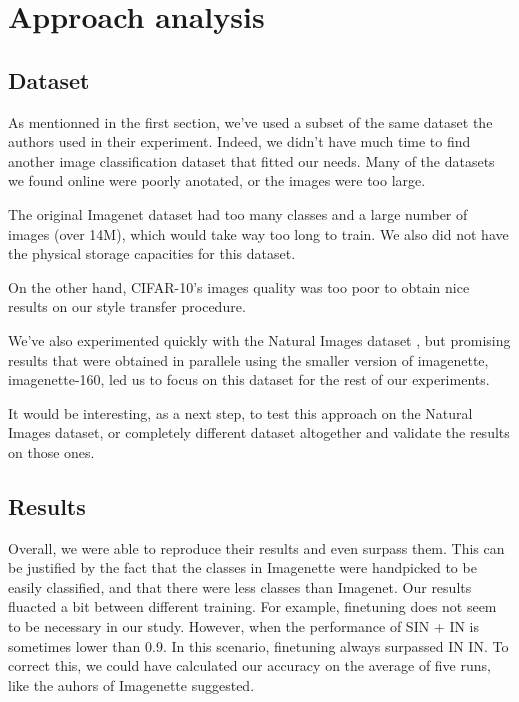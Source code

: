 \documentclass{article}
\begin{document}
\section{Approach analysis}

\subsection{Dataset}

As mentionned in the first section, we've used a subset of 
the same dataset the authors used in their experiment. 
Indeed, we didn't have much time to find another image classification dataset that fitted our needs.
Many of the datasets we found online were poorly anotated, or the images
were too large. \smallskip

\noindent
The original Imagenet dataset had too many classes and a large number of images (over 14M), 
which would take way too long to train. 
We also did not have the physical storage capacities for this dataset. \smallskip

\noindent
On the other hand, CIFAR-10's images quality was too poor 
to obtain nice results on our style transfer procedure. \smallskip

\noindent
We've also experimented quickly with the Natural Images dataset \cite{natural-images}, 
but promising results that were obtained in parallele using the smaller version of imagenette, 
imagenette-160, led us to focus on this dataset for the rest of our experiments. \smallskip

\noindent
It would be interesting, as a next step, to test this approach on the Natural Images dataset,
or completely different dataset altogether and validate the results on those ones.


\subsection{Results}

Overall, we were able to reproduce their results and
even surpass them. This can be justified by the fact that the classes
in Imagenette were handpicked to be easily classified, and that there were less 
classes than Imagenet.
Our results fluacted a bit between different training. For example, finetuning does not seem to be necessary 
in our study. However, when the performance of SIN + IN is sometimes lower than 0.9. In this scenario, finetuning
always surpassed IN \texorpdfstring{\textrightarrow} .IN.
To correct this, we could have calculated our accuracy on the average of five runs, like the auhors of Imagenette \cite{fastai2019}
suggested.
\end{document}

